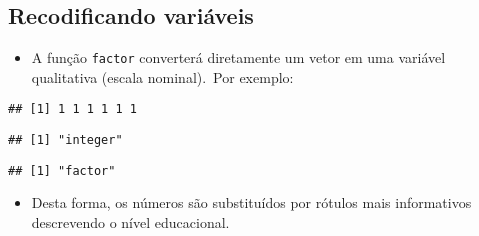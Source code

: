 \documentclass[]{article}
\newenvironment{Shaded}{\begin{snugshade}}{\end{snugshade}}
\newcommand{\KeywordTok}[1]{\textcolor[rgb]{0.13,0.29,0.53}{\textbf{#1}}}
\newcommand{\StringTok}[1]{\textcolor[rgb]{0.31,0.60,0.02}{#1}}
\newcommand{\CommentTok}[1]{\textcolor[rgb]{0.56,0.35,0.01}{\textit{#1}}}
\newcommand{\OperatorTok}[1]{\textcolor[rgb]{0.81,0.36,0.00}{\textbf{#1}}}
\newcommand{\NormalTok}[1]{#1}
\providecommand{\tightlist}{%
  \setlength{\itemsep}{0pt}\setlength{\parskip}{0pt}}
\begin{document}
\subsection{Recodificando variáveis}\label{recodificando-variaveis}

\begin{itemize}
\tightlist
\item
  A função \texttt{factor} converterá diretamente um vetor em uma
  variável qualitativa (escala nominal).~Por exemplo:
\end{itemize}

\begin{Shaded}
\end{Shaded}

\begin{verbatim}
## [1] 1 1 1 1 1 1
\end{verbatim}

\begin{Shaded}
\end{Shaded}

\begin{verbatim}
## [1] "integer"
\end{verbatim}

\begin{Shaded}
\end{Shaded}

\begin{verbatim}
## [1] "factor"
\end{verbatim}

\begin{Shaded}
\end{Shaded}

\begin{itemize}
\tightlist
\item
  Desta forma, os números são substituídos por rótulos mais informativos
  descrevendo o nível educacional.
\end{itemize}
\end{document}
